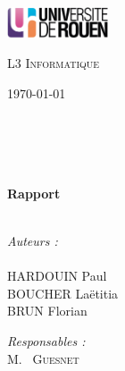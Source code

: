 
\begin{titlepage}

\begin{center}

\begin{minipage}[t]{0.48\textwidth}
  \begin{flushleft}
    \includegraphics [width=30mm]{images/logo-univ.jpg} \\[0.5cm]
    \begin{spacing}{1.5}
      \textsc{L3 Informatique}
    \end{spacing}
  \end{flushleft}
\end{minipage}
\begin{minipage}[t]{0.48\textwidth}
  \begin{flushright}
    \today
  \end{flushright}
\end{minipage} \\[1.5cm]

\textsc{\Large \reportsubject}\\[0.8cm]
\HRule \\[0.4cm]
{\huge \bfseries \reporttitle \\ Rapport}\\[0.8cm]
\HRule \\[1.5cm]

\parskip=200pt

\begin{minipage}[t]{0.3\textwidth}
  \begin{flushleft} \large
    \emph{Auteurs :}\\
    \reportauthor \\ 
    HARDOUIN Paul \\ 
    BOUCHER Laëtitia \\ 
    BRUN Florian
  \end{flushleft}
\end{minipage}
\begin{minipage}[t]{0.6\textwidth}
  \begin{flushright} \large
    \emph{Responsables :} \\
    M.~ \textsc{Guesnet} \\
  \end{flushright}
\end{minipage}

\vfill

\end{center}

\end{titlepage}
